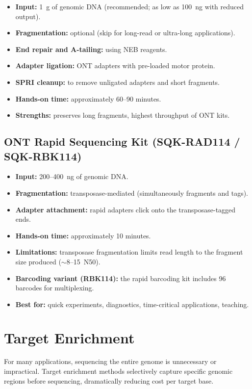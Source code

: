 \begin{itemize}[nosep]
  \item \textbf{Input:} 1~\textmu g of genomic DNA (recommended; as low as 100~ng with reduced output).
  \item \textbf{Fragmentation:} optional (skip for long-read or ultra-long applications).
  \item \textbf{End repair and A-tailing:} using NEB reagents.
  \item \textbf{Adapter ligation:} ONT adapters with pre-loaded motor protein.
  \item \textbf{SPRI cleanup:} to remove unligated adapters and short fragments.
  \item \textbf{Hands-on time:} approximately 60--90 minutes.
  \item \textbf{Strengths:} preserves long fragments, highest throughput of ONT kits.
\end{itemize}

\subsection{ONT Rapid Sequencing Kit (SQK-RAD114 / SQK-RBK114)}

\begin{itemize}[nosep]
  \item \textbf{Input:} 200--400~ng of genomic DNA.
  \item \textbf{Fragmentation:} transposase-mediated (simultaneously fragments and tags).
  \item \textbf{Adapter attachment:} rapid adapters click onto the transposase-tagged ends.
  \item \textbf{Hands-on time:} approximately 10 minutes.
  \item \textbf{Limitations:} transposase fragmentation limits read length to the fragment size produced (${\sim}$8--15\kilobase\ N50).
  \item \textbf{Barcoding variant (RBK114):} the rapid barcoding kit includes 96 barcodes for multiplexing.
  \item \textbf{Best for:} quick experiments, diagnostics, time-critical applications, teaching.
\end{itemize}


\section{Target Enrichment}
\label{sec:enrichment}

For many applications, sequencing the entire genome is unnecessary or impractical. Target enrichment methods selectively capture specific genomic regions before sequencing, dramatically reducing cost per target base.

